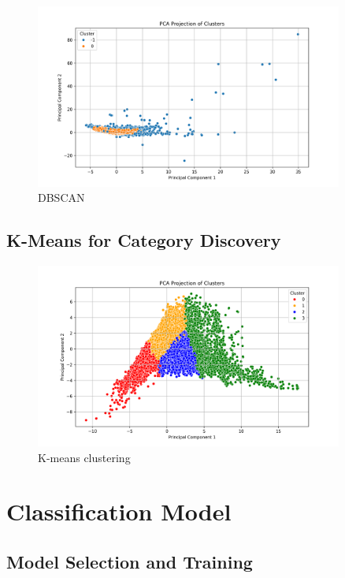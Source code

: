 \documentclass[a4paper,12pt,twoside]{scrreprt}
\begin{document}
\begin{figure}[htbp]
  \centering

  \includegraphics[width=0.9\textwidth]{Figures/dbscan_diagram_feature_data.png}
  \caption{DBSCAN}
  \label{fig:dbscan-clustering-outlier-removal}
\end{figure}
\FloatBarrier

\subsection{K-Means for Category Discovery}

\begin{figure}[htbp]
  \centering

  \includegraphics[width=0.9\textwidth]{Figures/kmeans_diagram_feature_data.png}
  \caption{K-means clustering}
  \label{fig:kmeans-clustering}
\end{figure}
\FloatBarrier

\section{Classification Model}

\subsection{Model Selection and Training}
\end{document}
